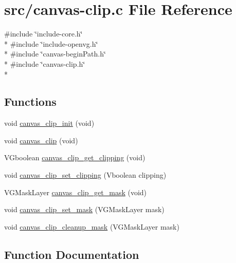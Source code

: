 \hypertarget{canvas-clip_8c}{}\section{src/canvas-\/clip.c File Reference}
\label{canvas-clip_8c}
{\ttfamily \#include \char`\"{}include-\/core.\+h\char`\"{}}\\*
{\ttfamily \#include \char`\"{}include-\/openvg.\+h\char`\"{}}\\*
{\ttfamily \#include \char`\"{}canvas-\/begin\+Path.\+h\char`\"{}}\\*
{\ttfamily \#include \char`\"{}canvas-\/clip.\+h\char`\"{}}\\*
\subsection*{Functions}
\begin{DoxyCompactItemize}
\item 
void \hyperlink{canvas-clip_8c_a2d531b09936a3622973c6902f251a8b7}{canvas\+\_\+clip\+\_\+init} (void)
\item 
void \hyperlink{canvas-clip_8c_ade0def031a2b4c1dcb342cb19c1ed695}{canvas\+\_\+clip} (void)
\item 
V\+Gboolean \hyperlink{canvas-clip_8c_a39b862c177870905789aefcf1cffb4ef}{canvas\+\_\+clip\+\_\+get\+\_\+clipping} (void)
\item 
void \hyperlink{canvas-clip_8c_ac84b32c692c901fade9dc96c2bf0efd6}{canvas\+\_\+clip\+\_\+set\+\_\+clipping} (Vboolean clipping)
\item 
V\+G\+Mask\+Layer \hyperlink{canvas-clip_8c_ade2b0675d3365ea8b81c8b31eed3f907}{canvas\+\_\+clip\+\_\+get\+\_\+mask} (void)
\item 
void \hyperlink{canvas-clip_8c_af889b304af28cd66095499ee7a2a2635}{canvas\+\_\+clip\+\_\+set\+\_\+mask} (V\+G\+Mask\+Layer mask)
\item 
void \hyperlink{canvas-clip_8c_a39e21e3c386f34eb80c2ea8dd437af23}{canvas\+\_\+clip\+\_\+cleanup\+\_\+mask} (V\+G\+Mask\+Layer mask)
\end{DoxyCompactItemize}


\subsection{Function Documentation}
\hypertarget{canvas-clip_8c_ade0def031a2b4c1dcb342cb19c1ed695}{}
